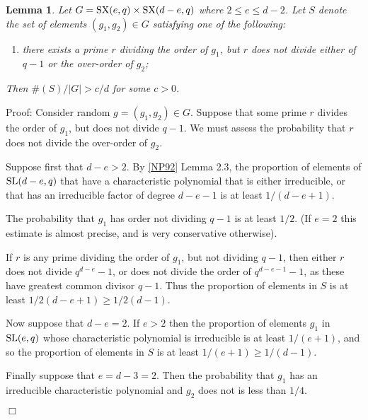 \documentclass[12pt]{article}
\newtheorem{lemma}[definition]{Lemma}
\newenvironment{proof}{\normalsize {\sc Proof}:}{{\hfill $\Box$ \\}}
\def\SL{{\rm SL}}
\def\SX{{\rm SX}}
\begin{document}
\begin{lemma}\label{Lemma8.1}  
Let $G=\SX(e,q)\times\SX(d-e,q)$ where $2 \leq e \leq d - 2$.
Let $S$ denote the set of elements $(g_1, g_2) \in G$ satisfying 
one of the following: 
\begin{enumerate}
\item[{\rm (i)}] 
there exists a prime $r$ dividing the order of $g_1$, 
but $r$ does not divide either of $q-1$ or the over-order of $g_2$; 
\end{enumerate}
Then $\#(S)/|G|>c/d$ for some $c>0$.
\end{lemma}
\begin{proof}
Consider random $g=(g_1,g_2) \in G$. 
Suppose that some prime $r$
divides the order of $g_1$, but does not divide $q-1$. We  must 
assess the probability that $r$ does not divide the over-order of $g_2$.

Suppose first that $d-e>2$.  By \ref{NP92} Lemma 2.3, the proportion of
elements of $\SL(d-e,q)$ that have a characteristic polynomial that is
either irreducible, or that has an irreducible factor of degree $d-e-1$ is 
at least $1/(d-e+1)$.

The probability that $g_1$ has order not dividing $q-1$ is at least $1/2$.
(If $e=2$ this estimate is almost precise, and is very conservative otherwise). 

If $r$ is any prime dividing the order of $g_1$, but not dividing $q-1$, then
either $r$ does not divide $q^{d-e}-1$, or does not divide the order of
$q^{d-e-1}-1$, as these have greatest common divisor $q-1$.  Thus 
the proportion of elements in $S$ is at least $1/2(d-e+1)\ge1/2(d-1)$.

Now suppose that $d-e=2$.  If $e>2$ then the proportion of elements $g_1$ in $\SL(e,q)$
whose characteristic polynomial is irreducible is at least $1/(e+1)$, and so the proportion
of elements in $S$ is at least $1/(e+1)\ge 1/(d-1)$.

Finally suppose that $e=d-3=2$.  Then the probability that $g_1$ has an irreducible
characteristic polynomial and $g_2$ does not is less than $1/4$.



\end{proof}
\end{document}
